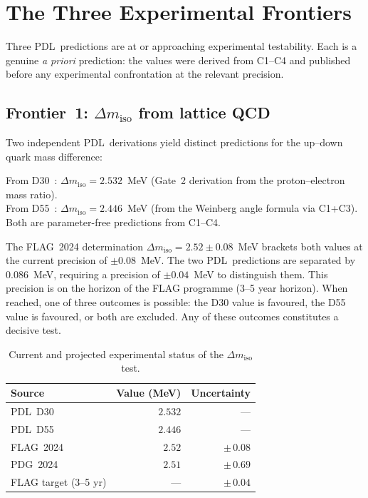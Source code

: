 \documentclass[12pt,a4paper]{article}
\newenvironment{predbox}[1][]{%
  \begin{tcolorbox}[predstyle,title={Falsifiable Prediction\ifx\relax#1\relax\else: #1\fi}]}{\end{tcolorbox}}
\theoremstyle{definition}
\newcommand{\PDL}{\textsc{PDL}}
\newcommand{\Dmiso}{\Delta m_{\mathrm{iso}}}
\begin{document}
\section{The Three Experimental Frontiers}
\label{sec:experimental}

Three \PDL\ predictions are at or approaching experimental testability. Each is a genuine \emph{a priori} prediction: the values were derived from C1--C4 and published before any experimental confrontation at the relevant precision.

\subsection{Frontier~1: \texorpdfstring{$\Dmiso$}{Delta m iso} from lattice QCD}

Two independent \PDL\ derivations yield distinct predictions for the up--down quark mass difference:

\begin{predbox}[P-Dmiso-1 and P-Dmiso-2]
From D30~\cite{PDL_D30}: $\Dmiso = 2.532$~MeV (Gate~2 derivation from the proton--electron mass ratio).\\
From D55~\cite{PDL_D55}: $\Dmiso = 2.446$~MeV (from the Weinberg angle formula via C1+C3).\\
Both are parameter-free predictions from C1--C4.
\end{predbox}

The FLAG~2024 determination $\Dmiso = 2.52 \pm 0.08$~MeV brackets both values at the current precision of $\pm 0.08$~MeV. The two \PDL\ predictions are separated by $0.086$~MeV, requiring a precision of $\pm 0.04$~MeV to distinguish them. This precision is on the horizon of the FLAG programme (3--5 year horizon). When reached, one of three outcomes is possible: the D30 value is favoured, the D55 value is favoured, or both are excluded. Any of these outcomes constitutes a decisive test.

\begin{table}[H]
\centering
\caption{Current and projected experimental status of the $\Dmiso$ test.}
\label{tab:dmiso}
\bigskip
\begin{tabular}{lrr}
\toprule
Source & Value (MeV) & Uncertainty \\
\midrule
\PDL\ D30 & $2.532$ & --- \\
\PDL\ D55 & $2.446$ & --- \\
FLAG~2024 & $2.52$ & $\pm\,0.08$ \\
PDG~2024 & $2.51$ & $\pm\,0.69$ \\
FLAG target (3--5 yr) & --- & $\pm\,0.04$ \\
\bottomrule
\end{tabular}
\end{table}
\end{document}
